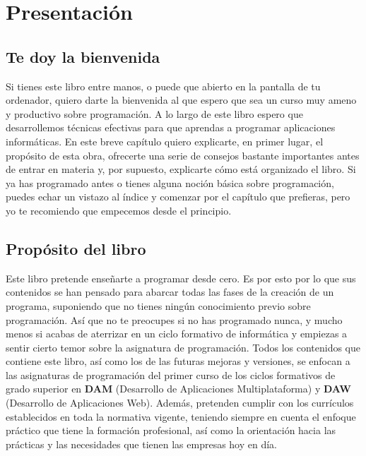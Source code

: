 
\chapter{Presentación}

\section{Te doy la bienvenida}

Si tienes este libro entre manos, o puede que abierto en la pantalla de tu ordenador, quiero darte la bienvenida al que espero que 
sea un curso muy ameno y productivo sobre programación. A lo largo de este libro espero que desarrollemos técnicas efectivas
para que aprendas a programar aplicaciones informáticas. En este breve capítulo quiero explicarte, en primer lugar, el propósito de esta
obra, ofrecerte una serie de consejos bastante importantes antes de entrar en materia y, por supuesto, explicarte cómo está organizado
el libro. Si ya has programado antes o tienes alguna noción básica sobre programación, puedes echar un vistazo al índice y comenzar
por el capítulo que prefieras, pero yo te recomiendo que empecemos desde el principio. 

\section{Propósito del libro}

Este libro pretende enseñarte a programar desde cero. Es por esto por lo que sus contenidos se han pensado para abarcar todas las fases
de la creación de un programa, suponiendo que no tienes ningún conocimiento previo sobre programación. Así que no te preocupes si no
has programado nunca, y mucho menos si acabas de aterrizar en un ciclo formativo de informática y empiezas a sentir cierto temor sobre
la asignatura de programación. Todos los contenidos que contiene este libro, así como los de las futuras mejoras y versiones, se 
enfocan a las asignaturas de programación del primer curso de los ciclos formativos de grado superior en \textbf{DAM} (Desarrollo de 
Aplicaciones Multiplataforma) y \textbf{DAW} (Desarrollo de Aplicaciones Web). Además, pretenden cumplir con los currículos establecidos en toda
la normativa vigente, teniendo siempre en cuenta el enfoque práctico que tiene la formación profesional, así como la orientación
hacia las prácticas y las necesidades que tienen las empresas hoy en día.


